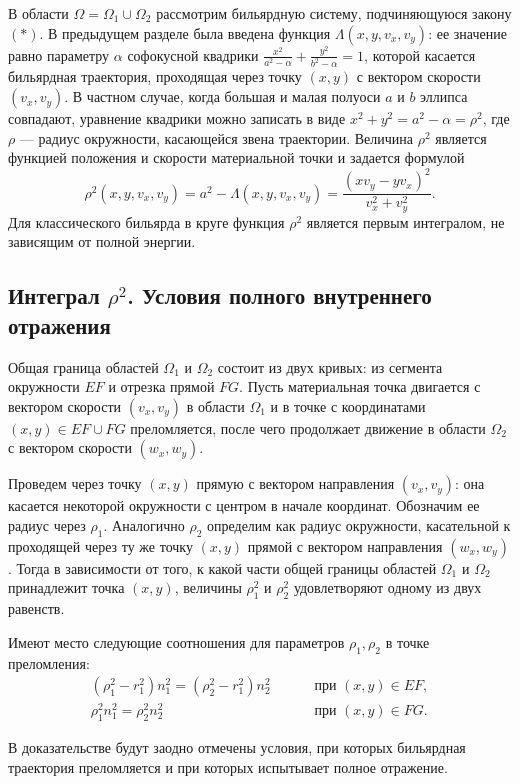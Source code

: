 В области $\Omega = \Omega_1 \cup \Omega_2$ рассмотрим бильярдную систему, подчиняющуюся закону $(\ast)$.
В предыдущем разделе была введена функция $\Lambda(x,y,v_x, v_y)$: ее значение равно параметру $\alpha$ софокусной квадрики $\frac{x^2}{a^2-\alpha} + \frac{y^2}{b^2-\alpha} = 1$, которой касается бильярдная траектория, проходящая через точку $(x,y)$ с вектором скорости $(v_x, v_y)$.
В частном случае, когда большая и малая полуоси $a$ и $b$ эллипса  совпадают, уравнение квадрики можно записать в виде $x^2 + y^2 = a^2-\alpha = \rho^2$, где $\rho$ --- радиус окружности, касающейся звена траектории.
Величина $\rho^2$ является функцией положения и скорости материальной точки и задается формулой $$\rho^2(x,y,v_x,v_y) = a^2 - \Lambda(x, y, v_x, v_y) = \frac{(x v_y - y v_x)^2}{v_x^2 + v_y^2}.$$
Для классического бильярда в круге  функция $\rho^2$ является первым интегралом, не зависящим от полной энергии.

\subsection{Интеграл $\rho^2$. Условия полного внутреннего отражения}\label{s3.2}
Общая граница областей $\Omega_1$ и $\Omega_2$ состоит из двух кривых: из сегмента окружности $EF$ и отрезка прямой $FG$. 
Пусть материальная точка двигается с вектором скорости $(v_x, v_y)$ в области $\Omega_1$ и в точке с координатами $(x,y) \in EF \cup FG$ преломляется, после чего продолжает движение в области $\Omega_2$ с вектором скорости $(w_x, w_y)$. 

Проведем через точку $(x,y)$ прямую с вектором направления $(v_x, v_y)$: она касается некоторой окружности с центром в начале координат. Обозначим ее радиус через $\rho_1$. Аналогично $\rho_2$ определим как радиус окружности, касательной к проходящей через ту же точку $(x,y)$ прямой с вектором направления $(w_x, w_y)$.
Тогда в зависимости от того, к какой части общей границы областей $\Omega_1$ и $\Omega_2$  принадлежит точка $(x,y)$, величины $\rho_1^2$ и $\rho_2^2$ удовлетворяют одному из двух равенств. 
\begin{statement}
Имеют место следующие соотношения для параметров $\rho_1, \rho_2$ в точке преломления:
\begin{align}
(\rho_1^2 - r_1^2)n_1^2 = (\rho_2^2 - r_1^2)n_2^2 \qquad & 
			\text{ при } (x,y) \in EF, 
			\label{eq:st1_eq1}
			\\
\rho_1^2 n_1^2 = \rho_2^2 n_2^2 \qquad  & \text{ при } (x,y) \in FG.
			\label{eq:st1_eq2}
\end{align}
\label{st:across_EF}
\end{statement}
\begin{remark}
В доказательстве будут заодно отмечены условия, при которых бильярдная траектория преломляется и при которых испытывает полное  отражение.
\end{remark}

